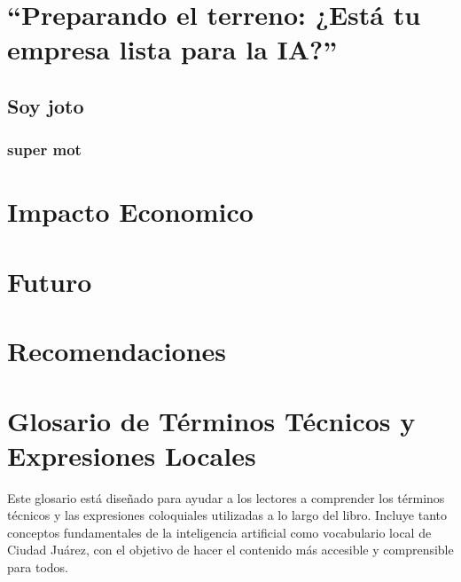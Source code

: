 \documentclass[
  10pt,
  letterpaper,
]{book}
\begin{document}

\chapter{``Preparando el terreno: ¿Está tu empresa lista para la
IA?''}\label{preparando-el-terreno-estuxe1-tu-empresa-lista-para-la-ia}

\section{Soy joto}\label{soy-joto}

\subsection{super mot}\label{super-mot}


\chapter{Impacto Economico}\label{impacto-economico}


\chapter{Futuro}\label{futuro}


\chapter{Recomendaciones}\label{recomendaciones}


\chapter{\texorpdfstring{\textbf{Glosario de Términos Técnicos y
Expresiones
Locales}}{Glosario de Términos Técnicos y Expresiones Locales}}\label{glosario-de-tuxe9rminos-tuxe9cnicos-y-expresiones-locales}

Este glosario está diseñado para ayudar a los lectores a comprender los
términos técnicos y las expresiones coloquiales utilizadas a lo largo
del libro. Incluye tanto conceptos fundamentales de la inteligencia
artificial como vocabulario local de Ciudad Juárez, con el objetivo de
hacer el contenido más accesible y comprensible para todos.
\end{document}
